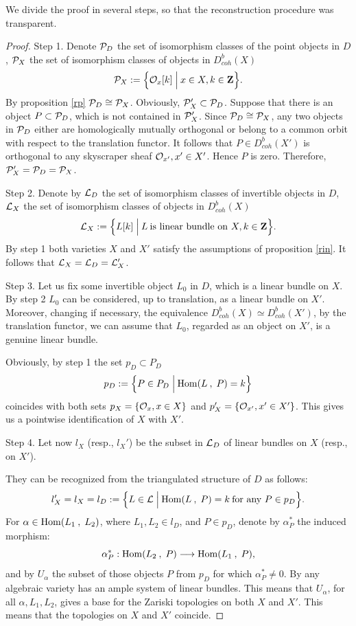 \documentclass[12pt]{article}
\def\db#1{ D^b_{coh}({#1})}
\def\h#1,#2{{\rm Hom}({#1}\:,\; {#2})}
\def\lto{\longrightarrow}
\def\o#1{{\cal O}_{#1}}
\begin{document}
We divide the proof in several steps, so that the reconstruction procedure was transparent.
\begin{proof}
Step 1. Denote ${\cal P}_D$ the set of isomorphism classes of the point objects in $D$, ${\cal P}_X$ the set of isomorphism  classes of objects in $\db{X}$
$$
{\cal P}_X:=\Bigl\{ {\o x}[k]\;\Bigl |\: x\in X, k\in {\bf Z}\Bigl\}.
$$
By proposition \ref{rp} ${\cal P}_D\cong{\cal P}_X$. Obviously, ${\cal P}_X'\subset {\cal P}_D$. Suppose that there is an object $P\subset {\cal P}_D$, which is not contained in ${\cal P}_X'$. Since ${\cal P}_D\cong{\cal P}_X$, any two objects in ${\cal P}_D$ either are homologically mutually orthogonal or belong to a common orbit with respect to the translation functor. It follows that $P\in\db{X'}$ is orthogonal to any skyscraper sheaf
 ${\cal O}_{x'}, x'\in X'$. Hence $P$ is zero. Therefore, ${\cal P}_X'=
{\cal P}_D= {\cal P}_X$.

Step 2.  Denote by ${\cal L}_D$ the set of isomorphism classes of invertible objects in $D$, ${\cal L}_X$ the set of
isomorphism classes of objects in $\db{X}$
$$
{\cal L}_X:=\Bigl\{ L[k]\;\Bigl |\: L\:\mbox{is linear bundle on } X , k\in {\bf Z}\Bigl\}. 
$$
By step 1 both varieties $X$ and $X'$ satisfy the assumptions of proposition \ref{rin}. It follows that ${\cal L}_X= {\cal L}_D= {\cal L}_X'$.

Step 3.  Let us fix some invertible object $L_0$ in $D$, which is a linear bundle on $X$. By step 2 $L_0$ can be considered, up to translation, as a linear bundle on $X'$. Moreover, changing if necessary, the equivalence $\db{X}\simeq\db{X'}$, by the translation functor, we can assume that $L_0$, regarded as an object on $X'$, is a genuine linear bundle.

Obviously, by step 1 the set $p_D\subset P_D$
$$
p_D:=\Bigl\{ P\in P_D \;\Bigl |\: {\h L, P}=k\Bigl\}
$$
coincides with both sets $p_X=\{{\o x}, x\in X\}$ and $p_X'=\{{\cal O}_{x'}, x'\in X'\}$. This gives us a pointwise identification of $X$ with $X'$.

Step 4.  Let now $l_X$ (resp., $l_X'$) be the subset in ${\cal L}_D$ of linear bundles on $X$ (resp., on $X'$).

They can be recognized from the triangulated structure of $D$ as follows:
$$
l_X'=l_X=l_D:=\Bigl\{ L\in {\cal L}\;\Bigl |\:{\h L, P}=k \:\mbox{for any } P\in p_D \Bigl\}.
$$
For $\alpha\in{\h L_1, {L_2}}$, where $L_1, L_2\in l_D$, and $P\in p_D$, denote by $\alpha^*_P$ the induced morphism:
$$
\alpha^*_P: {\h L_2, P}\lto {\h L_1, P},
$$
and by $U_{\alpha}$ the subset of those objects $P$ from $p_D$ for which $\alpha^*_P\ne 0$. By \cite{Il} any algebraic variety has an ample system of linear bundles. This means that $U_{\alpha}$, for all ${\alpha}, L_1, L_2$, gives a base for the Zariski topologies on both $X$ and $X'$. This means that the topologies on $X$ and $X'$ coincide.


\end{proof}
\end{document}
